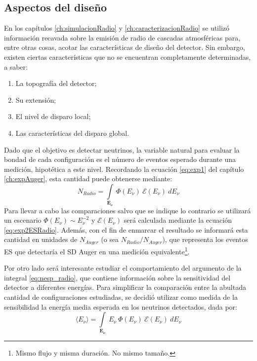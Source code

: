 	\subsection{Aspectos del dise\~no}
	
	En los cap\'itulos \ref{ch:simulacionRadio} y \ref{ch:caracterizacionRadio} se utiliz\'o informaci\'on recavada sobre la emisi\'on de radio de cascadas atmosf\'ericas para, entre otras cosas, acotar las caracter\'isticas de dise\~no del detector.
	Sin embargo, existen ciertas caracter\'isticas que no se encuentran completamente determinadas, a saber:
	\begin{enumerate}
	 \item La topograf\'ia del detector;
	 \item Su extensi\'on;
	 \item El nivel de disparo local;
	 \item Las caracter\'isticas del disparo global.
	\end{enumerate}
	
	Dado que el objetivo es detectar neutrinos, la variable natural para evaluar la bondad de cada configuraci\'on es el n\'umero de eventos esperado durante una medici\'on, hipot\'etica a este nivel.
	Recordando la ecuaci\'on \ref{eq:exp1} del cap\'itulo \ref{ch:expAuger}, esta cantidad puede obtenerse mediante:
	\begin{equation}
		N_{Radio} = \int\limits_{\mathbf{E_\nu}}~\Phi(E_{\nu})~\mathcal{E}(E_\nu)~dE_{\nu}
		\label{eq:nesp_radio}
	\end{equation}
	Para llevar a cabo las comparaciones salvo que se indique lo contrario se utilizar\'a un escenario $\Phi(E_{\nu})\sim E_{\nu}^{-2}$ y $\mathcal{E}(E_\nu)$ ser\'a calculada mediante la ecuaci\'on \ref{eq:exp2ESRadio}.
	Adem\'as, con el fin de enmarcar el resultado se informar\'a esta cantidad en unidades de $N_{Auger}$ (o sea $N_{Radio}/N_{Auger}$), que representa los eventos ES que detectar\'ia el SD Auger en una medici\'on equivalente\footnote{Mismo flujo y misma duraci\'on. No mismo tama\~no.}.
	
	Por otro lado ser\'a interesante estudiar el comportamiento del argumento de la integral \ref{eq:nesp_radio}, que contiene informaci\'on sobre la sensitividad del detector a diferentes energ\'ias.
	Para simplificar la comparaci\'on entre la abultada cantidad de configuraciones estudiadas, se decidi\'o utilizar como medida de la sensibilidad la energ\'ia media esperada en los neutrinos detectados, dada por:
	\begin{equation}
		\langle E_{\nu}\rangle = \int\limits_{\mathbf{E_\nu}}~E_\nu~\Phi(E_{\nu})~\mathcal{E}(E_\nu)~dE_{\nu}
		\label{eq:emean_radio}
	\end{equation}
	
